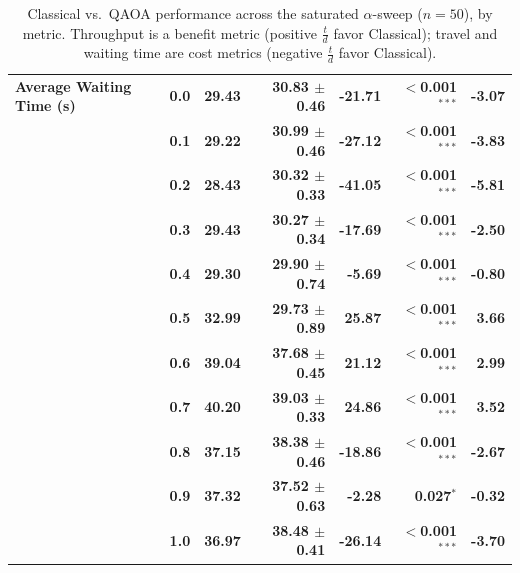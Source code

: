 \documentclass[12pt]{article}
\begin{document}
\begin{table}[H]
\begin{tabular}{lrrrrrr}
\addlinespace
{\boldmath\bfseries Average Waiting Time (s)} & {\boldmath\bfseries 0.0} & {\boldmath\bfseries 29.43} & {\boldmath\bfseries 30.83 $\pm$ 0.46} & {\boldmath\bfseries -21.71} & {\boldmath\bfseries $<$0.001$^{***}$} & {\boldmath\bfseries -3.07} \\
 & {\boldmath\bfseries 0.1} & {\boldmath\bfseries 29.22} & {\boldmath\bfseries 30.99 $\pm$ 0.46} & {\boldmath\bfseries -27.12} & {\boldmath\bfseries $<$0.001$^{***}$} & {\boldmath\bfseries -3.83} \\
 & {\boldmath\bfseries 0.2} & {\boldmath\bfseries 28.43} & {\boldmath\bfseries 30.32 $\pm$ 0.33} & {\boldmath\bfseries -41.05} & {\boldmath\bfseries $<$0.001$^{***}$} & {\boldmath\bfseries -5.81} \\
 & {\boldmath\bfseries 0.3} & {\boldmath\bfseries 29.43} & {\boldmath\bfseries 30.27 $\pm$ 0.34} & {\boldmath\bfseries -17.69} & {\boldmath\bfseries $<$0.001$^{***}$} & {\boldmath\bfseries -2.50} \\
 & {\boldmath\bfseries 0.4} & {\boldmath\bfseries 29.30} & {\boldmath\bfseries 29.90 $\pm$ 0.74} & {\boldmath\bfseries -5.69} & {\boldmath\bfseries $<$0.001$^{***}$} & {\boldmath\bfseries -0.80} \\
 & {\boldmath\bfseries 0.5} & {\boldmath\bfseries 32.99} & {\boldmath\bfseries 29.73 $\pm$ 0.89} & {\boldmath\bfseries 25.87} & {\boldmath\bfseries $<$0.001$^{***}$} & {\boldmath\bfseries 3.66} \\
 & {\boldmath\bfseries 0.6} & {\boldmath\bfseries 39.04} & {\boldmath\bfseries 37.68 $\pm$ 0.45} & {\boldmath\bfseries 21.12} & {\boldmath\bfseries $<$0.001$^{***}$} & {\boldmath\bfseries 2.99} \\
 & {\boldmath\bfseries 0.7} & {\boldmath\bfseries 40.20} & {\boldmath\bfseries 39.03 $\pm$ 0.33} & {\boldmath\bfseries 24.86} & {\boldmath\bfseries $<$0.001$^{***}$} & {\boldmath\bfseries 3.52} \\
 & {\boldmath\bfseries 0.8} & {\boldmath\bfseries 37.15} & {\boldmath\bfseries 38.38 $\pm$ 0.46} & {\boldmath\bfseries -18.86} & {\boldmath\bfseries $<$0.001$^{***}$} & {\boldmath\bfseries -2.67} \\
 & {\boldmath\bfseries 0.9} & {\boldmath\bfseries 37.32} & {\boldmath\bfseries 37.52 $\pm$ 0.63} & {\boldmath\bfseries -2.28} & {\boldmath\bfseries 0.027$^{*}$} & {\boldmath\bfseries -0.32} \\
 & {\boldmath\bfseries 1.0} & {\boldmath\bfseries 36.97} & {\boldmath\bfseries 38.48 $\pm$ 0.41} & {\boldmath\bfseries -26.14} & {\boldmath\bfseries $<$0.001$^{***}$} & {\boldmath\bfseries -3.70} \\
\bottomrule
\end{tabular}
\caption{Classical vs.\ QAOA performance across the saturated $\alpha$-sweep ($n=50$),
by metric. Throughput is a benefit metric (positive $\frac{t}{d}$ favor Classical); travel
and waiting time are cost metrics (negative $\frac{t}{d}$ favor Classical).}
\label{tab:classical_vs_qaoa_alpha}
\end{table}
\end{document}

